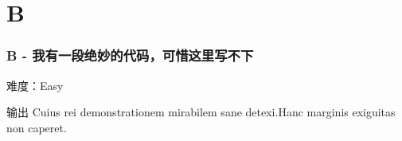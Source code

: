 \section{B}
\begin{frame}
\frametitle{B - 我有一段绝妙的代码，可惜这里写不下}
难度：Easy
\begin{block}{输出}
    Cuius rei demonstrationem mirabilem sane detexi.Hanc marginis exiguitas non caperet.
\end{block}
\end{frame}